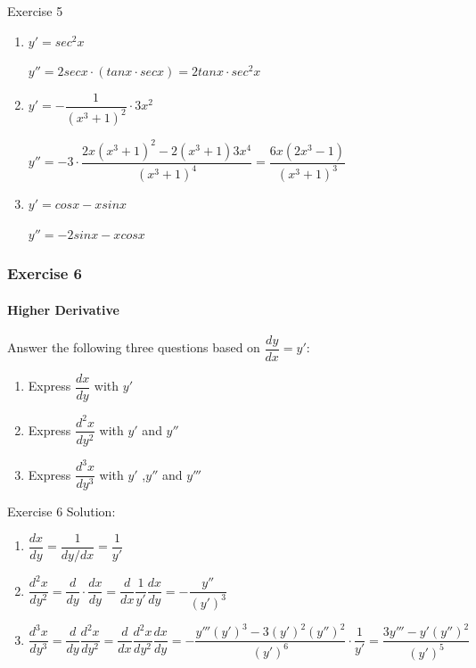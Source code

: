\begin{frame}{Exercise 5}
    \begin{enumerate}
        \item $y' = sec^2x$

              $y'' = 2secx \cdot (tanx \cdot secx) = 2tanx \cdot sec^2x$
        \item $y' = -\dfrac{1}{(x^3 + 1)^2}\cdot 3x^2$

              $y'' = -3 \cdot \dfrac{2x(x^3+1)^2 - 2(x^3+1)3x^4}{(x^3 + 1)^4} = \dfrac{6x(2x^3 - 1)}{(x^3 + 1)^3}$
        \item $y' = cosx - xsinx$

              $y'' = -2sinx - xcosx$
    \end{enumerate}
\end{frame}



\begin{frame}
    \frametitle{Exercise 6}
    \framesubtitle{Higher Derivative}
    Answer the following three questions based on $\dfrac{dy}{dx} = y'$:
    \begin{enumerate}
        \item Express $\dfrac{dx}{dy}$ with $y'$
        \item Express $\dfrac{d^{2}x}{dy^{2}}$ with $y'$ and $y''$
        \item Express $\dfrac{d^{3}x}{dy^{3}}$ with $y'$ ,$y''$ and $y'''$
    \end{enumerate}
\end{frame}



\begin{frame}{Exercise 6}
    Solution:
    \begin{enumerate}
        \item $\dfrac{dx}{dy} = \dfrac{1}{dy/dx} = \dfrac{1}{y'}$
        \item $\dfrac{d^2x}{dy^2} = \dfrac{d}{dy}\cdot \dfrac{dx}{dy} = \dfrac{d}{dx}\dfrac{1}{y'}\dfrac{dx}{dy} = -\dfrac{y''}{(y')^3}$
        \item $\dfrac{d^3x}{dy^3} = \dfrac{d}{dy}\dfrac{d^2x}{dy^2} = \dfrac{d}{dx}\dfrac{d^2x}{dy^2}\dfrac{dx}{dy} = - \dfrac{y'''(y')^3 - 3(y')^2(y'')^2}{(y')^6}\cdot \dfrac{1}{y'} = \dfrac{3y''' - y' (y'')^2}{(y')^5}$
    \end{enumerate}

\end{frame}



